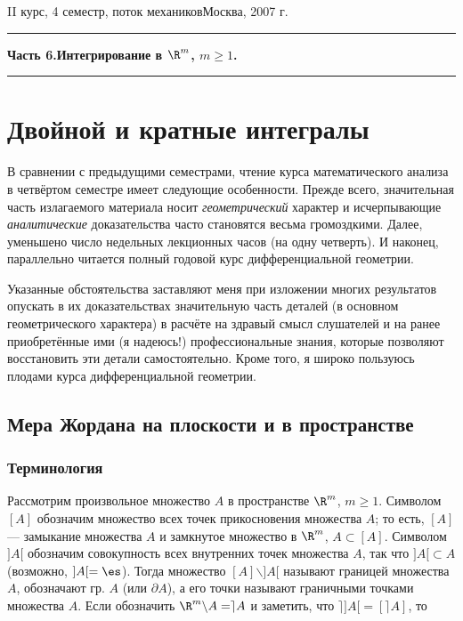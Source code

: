 \documentclass[a4paper]{article}
\begin{document}
 {II курс, 4 семестр, поток
механиков}{Москва, 2007 г.}

\pagebreak


\dmvntrail
\medskip
\medskip
\medskip
\tableofcontents \pagebreak


\hrule\begin{center}\LARGE \bf Часть 6.\hfill Интегрирование в
$\R^m$, $m\ge1$.\end{center}\hrule
\section{Двойной и кратные интегралы}

В сравнении с предыдущими семестрами, чтение курса математического
анализа в четвёртом семестре имеет следующие особенности. Прежде
всего, значительная часть излагаемого материала носит
\emph{геометрический} характер и исчерпывающие \emph{аналитические}
доказательства часто становятся весьма громоздкими. Далее, уменьшено
число недельных лекционных часов (на одну четверть). И наконец,
параллельно читается полный годовой курс дифференциальной геометрии.

Указанные обстоятельства заставляют меня при изложении многих
результатов опускать в их доказательствах значительную часть деталей
(в основном геометрического характера) в расчёте на здравый смысл
слушателей и на ранее приобретённые ими (я надеюсь!)
профессиональные знания, которые позволяют восстановить эти детали
самостоятельно. Кроме того, я широко пользуюсь плодами курса
дифференциальной геометрии.


\subsection{Мера Жордана на плоскости и в пространстве}

\subsubsection{Терминология}

Рассмотрим произвольное множество $A$ в пространстве $\R^m$,
$m\ge1$. Символом $[A]$ обозначим множество всех точек прикосновения
множества $A$; то есть, $[A]$ --- замыкание множества $A$ и
замкнутое множество в $\R^m$, $A\subset[A]$. Символом $]A[$
обозначим совокупность всех внутренних точек множества $A$, так что
$]A[\subset A$ (возможно, $]A[=\es$). Тогда множество $[A]\backslash
]A[$ называют границей множества $A$, обозначают гр. $A$ (или
$\partial A$), а его точки называют граничными точками множества
$A$. Если обозначить $\R^m \backslash A = \rceil A$ и заметить, что
$\rceil ]A[=[\rceil A]$, то \eqa{1}{гр.\,А = [A]\backslash ]A[ = [A]
\cap \rceil ]A[ = [A] \cap [\rceil A].}
\end{document}
